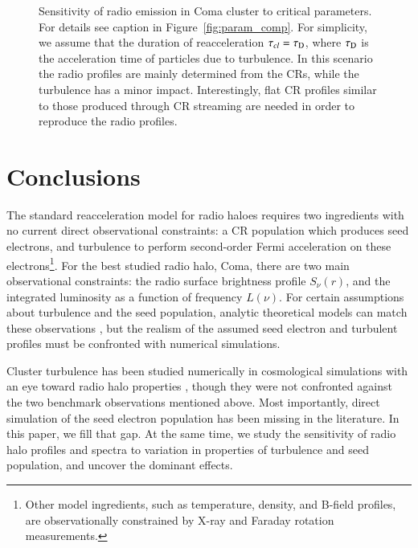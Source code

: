 \documentclass[fleqn,usenatbib,useAMS]{mnras}
\begin{document}
\begin{figure}
\begin{minipage}{1\columnwidth}
\begin{center}
   \end{center}
\end{minipage}
\caption{Sensitivity of radio emission in Coma cluster to critical
  parameters. For details see caption in
  Figure~\ref{fig:param_comp}. For simplicity, we assume that the
  duration of reacceleration $\tau_{cl}=\tau_{\rm D}$, where $\tau_{\rm
    D}$ is the acceleration time of particles due to turbulence. In
  this scenario the radio profiles are mainly determined from the CRs,
  while the turbulence has a minor impact. Interestingly, flat CR
  profiles similar to those produced through CR streaming are needed in
  order to reproduce the radio profiles.}
  \label{fig:param_comp_tcl_tD}
\end{figure}

\section{Conclusions}
\label{sec:conclusions}

The standard reacceleration model for radio haloes requires two ingredients with
no current direct observational constraints: a CR population which produces seed
electrons, and turbulence to perform second-order Fermi acceleration on these
electrons\footnote{Other model ingredients, such as temperature, density, and
  B-field profiles, are observationally constrained by X-ray and Faraday
  rotation measurements.}. For the best studied radio halo, Coma, there are two
main observational constraints: the radio surface brightness profile
$S_{\nu}(r)$, and the integrated luminosity as a function of frequency
$L(\nu)$. For certain assumptions about turbulence and the seed population,
analytic theoretical models can match these observations \citep{brunetti11}, but
the realism of the assumed seed electron and turbulent profiles must be
confronted with numerical simulations.

Cluster turbulence has been studied numerically in cosmological simulations with
an eye toward radio halo properties \citep{2013ApJ...771..131B,
  miniati15}, though they were not confronted against the two
benchmark observations mentioned above. Most importantly, direct simulation of the
seed electron population has been missing in the literature. In this paper, we
fill that gap. At the same time, we study the sensitivity of radio halo profiles
and spectra to variation in properties of turbulence and seed population, and
uncover the dominant effects.
\end{document}
